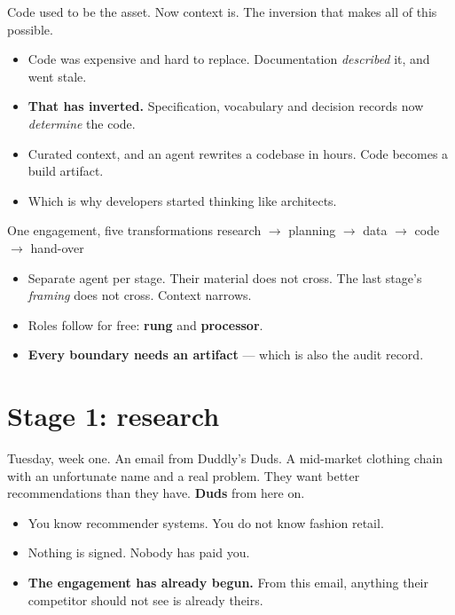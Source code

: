 \documentclass[aspectratio=169,t]{beamer}
\begin{document}
\begin{frame}{Code used to be the asset. Now context is.}
    The inversion that makes all of this possible.
    \begin{itemize}
        \item Code was expensive and hard to replace. Documentation
              \emph{described} it, and went stale.
        \item \textbf{That has inverted.} Specification, vocabulary and decision
              records now \emph{determine} the code.
        \item Curated context, and an agent rewrites a codebase in hours.
              Code becomes a build artifact.
        \item Which is why developers started thinking like architects.
    \end{itemize}
\end{frame}

\begin{frame}{One engagement, five transformations}
    research $\rightarrow$ planning $\rightarrow$ data $\rightarrow$ code
    $\rightarrow$ hand-over
    \begin{itemize}
        \item Separate agent per stage. Their material does not cross. The last
              stage's \emph{framing} does not cross. Context narrows.
        \item Roles follow for free: \textbf{rung} and \textbf{processor}.
        \item \textbf{Every boundary needs an artifact} --- which is also the
              audit record.
    \end{itemize}
\end{frame}

\section{Stage 1: research}

\begin{frame}{Tuesday, week one. An email from Duddly's Duds.}
    A mid-market clothing chain with an unfortunate name and a real problem. They
    want better recommendations than they have. \textbf{Duds} from here on.
    \begin{itemize}
        \item You know recommender systems. You do not know fashion retail.
        \item Nothing is signed. Nobody has paid you.
        \item \textbf{The engagement has already begun.} From this email, anything
              their competitor should not see is already theirs.
    \end{itemize}
\end{frame}
\end{document}
